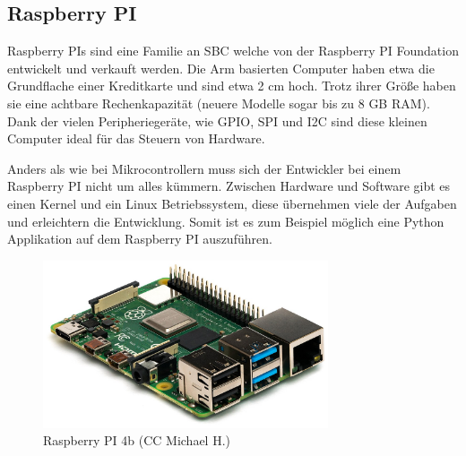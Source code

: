 ﻿\subsection{Raspberry PI}

Raspberry PIs sind eine Familie an \ac{SBC} welche von der Raspberry PI Foundation entwickelt und verkauft werden. Die \ac{Arm} basierten Computer haben etwa die Grundflache einer Kreditkarte und sind etwa 2 cm hoch. Trotz ihrer Größe haben sie eine achtbare Rechenkapazität (neuere Modelle sogar bis zu 8 GB \ac{RAM}\cite{raspberry_pi_4b}). Dank der vielen Peripheriegeräte, wie \ac{GPIO}, \ac{SPI} und \ac{I2C} sind diese kleinen Computer ideal für das Steuern von Hardware.

Anders als wie bei Mikrocontrollern muss sich der Entwickler bei einem Raspberry PI nicht um alles kümmern. Zwischen Hardware und Software gibt es einen Kernel und ein Linux Betriebssystem, diese übernehmen viele der Aufgaben und erleichtern die Entwicklung. Somit ist es zum Beispiel möglich eine Python Applikation auf dem Raspberry PI auszuführen.

\begin{figure}
  \centering
  \includegraphics[width=0.75\textwidth]{images/raspberry_pi_4b}
  \caption{Raspberry PI 4b (CC Michael H.)}
  \label{fig:raspberry_pi_4b}
\end{figure}